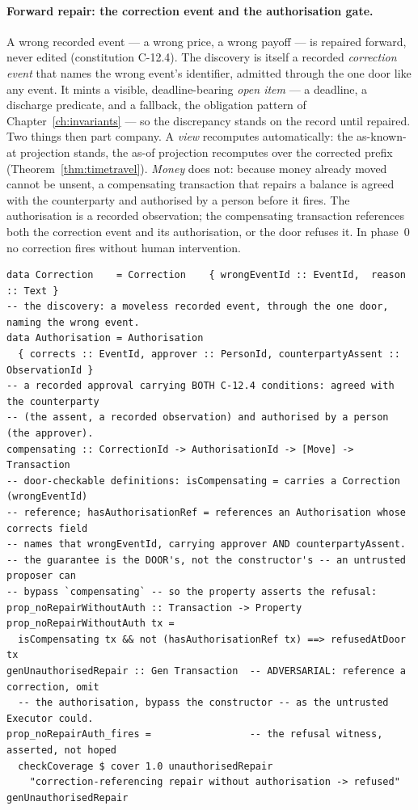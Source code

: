 \documentclass[11pt,a4paper]{article}
\begin{document}
\paragraph{Forward repair: the correction event and the authorisation gate.}
A wrong recorded event --- a wrong price, a wrong payoff --- is repaired forward, never
edited (constitution C-12.4). The discovery is itself a recorded \emph{correction event}
that names the wrong event's identifier, admitted through the one door like any event. It
mints a visible, deadline-bearing \emph{open item} --- a deadline, a discharge predicate,
and a fallback, the obligation pattern of Chapter~\ref{ch:invariants} --- so the discrepancy
stands on the record until repaired. Two things then part company. A \emph{view} recomputes
automatically: the as-known-at projection stands, the as-of projection recomputes over the
corrected prefix (Theorem~\ref{thm:timetravel}). \emph{Money} does not: because money already
moved cannot be unsent, a compensating transaction that repairs a balance is agreed with the
counterparty and authorised by a person before it fires. The authorisation is a recorded
observation; the compensating transaction references both the correction event and its
authorisation, or the door refuses it. In phase~0 no correction fires without human
intervention.

\begin{lstlisting}
data Correction    = Correction    { wrongEventId :: EventId,  reason   :: Text }
-- the discovery: a moveless recorded event, through the one door, naming the wrong event.
data Authorisation = Authorisation
  { corrects :: EventId, approver :: PersonId, counterpartyAssent :: ObservationId }
-- a recorded approval carrying BOTH C-12.4 conditions: agreed with the counterparty
-- (the assent, a recorded observation) and authorised by a person (the approver).
compensating :: CorrectionId -> AuthorisationId -> [Move] -> Transaction
-- door-checkable definitions: isCompensating = carries a Correction (wrongEventId)
-- reference; hasAuthorisationRef = references an Authorisation whose corrects field
-- names that wrongEventId, carrying approver AND counterpartyAssent.
-- the guarantee is the DOOR's, not the constructor's -- an untrusted proposer can
-- bypass `compensating` -- so the property asserts the refusal:
prop_noRepairWithoutAuth :: Transaction -> Property
prop_noRepairWithoutAuth tx =
  isCompensating tx && not (hasAuthorisationRef tx) ==> refusedAtDoor tx
genUnauthorisedRepair :: Gen Transaction  -- ADVERSARIAL: reference a correction, omit
  -- the authorisation, bypass the constructor -- as the untrusted Executor could.
prop_noRepairAuth_fires =                 -- the refusal witness, asserted, not hoped
  checkCoverage $ cover 1.0 unauthorisedRepair
    "correction-referencing repair without authorisation -> refused" genUnauthorisedRepair
\end{lstlisting}
\end{document}
